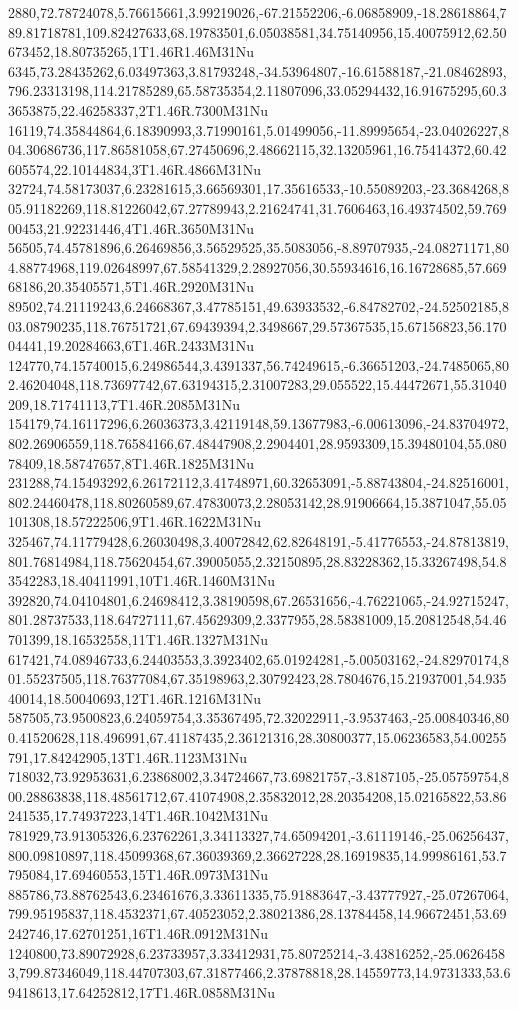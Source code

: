 2880,72.78724078,5.76615661,3.99219026,-67.21552206,-6.06858909,-18.28618864,789.81718781,109.82427633,68.19783501,6.05038581,34.75140956,15.40075912,62.50673452,18.80735265,1T1.46R1.46M31Nu
6345,73.28435262,6.03497363,3.81793248,-34.53964807,-16.61588187,-21.08462893,796.23313198,114.21785289,65.58735354,2.11807096,33.05294432,16.91675295,60.33653875,22.46258337,2T1.46R.7300M31Nu
16119,74.35844864,6.18390993,3.71990161,5.01499056,-11.89995654,-23.04026227,804.30686736,117.86581058,67.27450696,2.48662115,32.13205961,16.75414372,60.42605574,22.10144834,3T1.46R.4866M31Nu
32724,74.58173037,6.23281615,3.66569301,17.35616533,-10.55089203,-23.3684268,805.91182269,118.81226042,67.27789943,2.21624741,31.7606463,16.49374502,59.76900453,21.92231446,4T1.46R.3650M31Nu
56505,74.45781896,6.26469856,3.56529525,35.5083056,-8.89707935,-24.08271171,804.88774968,119.02648997,67.58541329,2.28927056,30.55934616,16.16728685,57.66968186,20.35405571,5T1.46R.2920M31Nu
89502,74.21119243,6.24668367,3.47785151,49.63933532,-6.84782702,-24.52502185,803.08790235,118.76751721,67.69439394,2.3498667,29.57367535,15.67156823,56.17004441,19.20284663,6T1.46R.2433M31Nu
124770,74.15740015,6.24986544,3.4391337,56.74249615,-6.36651203,-24.7485065,802.46204048,118.73697742,67.63194315,2.31007283,29.055522,15.44472671,55.31040209,18.71741113,7T1.46R.2085M31Nu
154179,74.16117296,6.26036373,3.42119148,59.13677983,-6.00613096,-24.83704972,802.26906559,118.76584166,67.48447908,2.2904401,28.9593309,15.39480104,55.08078409,18.58747657,8T1.46R.1825M31Nu
231288,74.15493292,6.26172112,3.41748971,60.32653091,-5.88743804,-24.82516001,802.24460478,118.80260589,67.47830073,2.28053142,28.91906664,15.3871047,55.05101308,18.57222506,9T1.46R.1622M31Nu
325467,74.11779428,6.26030498,3.40072842,62.82648191,-5.41776553,-24.87813819,801.76814984,118.75620454,67.39005055,2.32150895,28.83228362,15.33267498,54.83542283,18.40411991,10T1.46R.1460M31Nu
392820,74.04104801,6.24698412,3.38190598,67.26531656,-4.76221065,-24.92715247,801.28737533,118.64727111,67.45629309,2.3377955,28.58381009,15.20812548,54.46701399,18.16532558,11T1.46R.1327M31Nu
617421,74.08946733,6.24403553,3.3923402,65.01924281,-5.00503162,-24.82970174,801.55237505,118.76377084,67.35198963,2.30792423,28.7804676,15.21937001,54.93540014,18.50040693,12T1.46R.1216M31Nu
587505,73.9500823,6.24059754,3.35367495,72.32022911,-3.9537463,-25.00840346,800.41520628,118.496991,67.41187435,2.36121316,28.30800377,15.06236583,54.00255791,17.84242905,13T1.46R.1123M31Nu
718032,73.92953631,6.23868002,3.34724667,73.69821757,-3.8187105,-25.05759754,800.28863838,118.48561712,67.41074908,2.35832012,28.20354208,15.02165822,53.86241535,17.74937223,14T1.46R.1042M31Nu
781929,73.91305326,6.23762261,3.34113327,74.65094201,-3.61119146,-25.06256437,800.09810897,118.45099368,67.36039369,2.36627228,28.16919835,14.99986161,53.7795084,17.69460553,15T1.46R.0973M31Nu
885786,73.88762543,6.23461676,3.33611335,75.91883647,-3.43777927,-25.07267064,799.95195837,118.4532371,67.40523052,2.38021386,28.13784458,14.96672451,53.69242746,17.62701251,16T1.46R.0912M31Nu
1240800,73.89072928,6.23733957,3.33412931,75.80725214,-3.43816252,-25.06264583,799.87346049,118.44707303,67.31877466,2.37878818,28.14559773,14.9731333,53.69418613,17.64252812,17T1.46R.0858M31Nu
